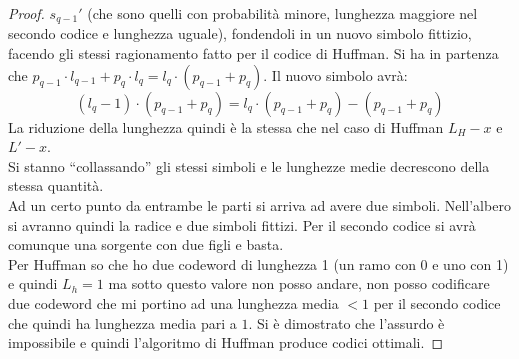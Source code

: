 \documentclass[a4paper,12pt, oneside]{book}
\begin{document}
\begin{proof}
  $s_{q-1}'$ (che sono quelli con probabilità minore, lunghezza maggiore nel
  secondo codice e lunghezza uguale), fondendoli in un nuovo simbolo
  fittizio, facendo gli stessi ragionamento fatto per il codice di Huffman.
  Si ha in partenza che $p_{q-1}\cdot l_{q-1}+p_q\cdot l_q=l_q\cdot
  (p_{q-1}+p_q)$.  
  Il nuovo simbolo avrà:
  \[(l_q-1)\cdot (p_{q-1}+p_q)=l_q\cdot (p_{q-1}+p_q)- (p_{q-1}+p_q)\]
  La riduzione della lunghezza quindi è la stessa che nel caso di Huffman 
  $L_H-x$ e $L'-x$.\\ 
  Si stanno ``collassando'' gli stessi simboli e le lunghezze medie decrescono
  della stessa quantità.\\
  Ad un certo punto da entrambe le parti si arriva ad avere due
  simboli. Nell'albero si avranno quindi la radice e due simboli fittizi. Per il
  secondo codice si avrà comunque una sorgente con due figli e basta. \\
  Per Huffman so che ho due codeword di lunghezza 1 (un ramo con 0 e uno con 1)
  e quindi $L_h=1$ ma sotto questo valore non posso andare, non posso codificare
  due codeword che mi portino ad una lunghezza media $<1$ per il secondo codice
  che quindi ha lunghezza media pari a $1$. Si è dimostrato che l'assurdo è
  impossibile e quindi l'algoritmo di Huffman produce codici ottimali.
\end{proof}
\end{document}
